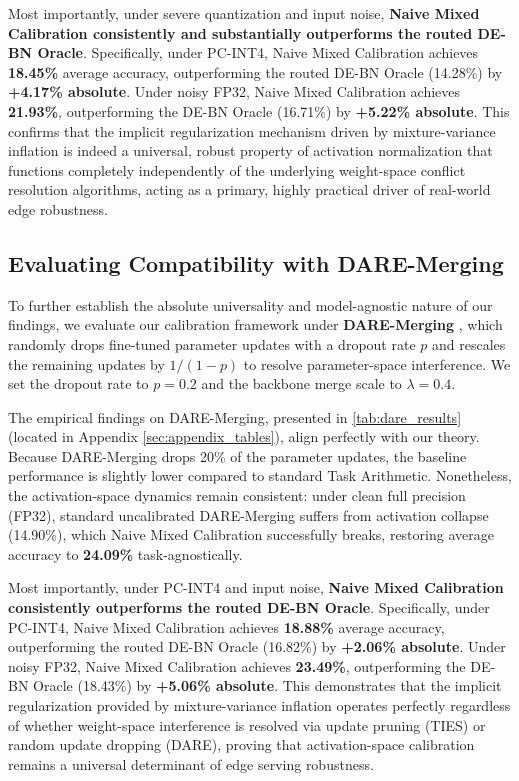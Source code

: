 \documentclass{article}
\theoremstyle{plain}
\theoremstyle{definition}
\theoremstyle{remark}
\begin{document}
Most importantly, under severe quantization and input noise, \textbf{Naive Mixed Calibration consistently and substantially outperforms the routed DE-BN Oracle}. Specifically, under PC-INT4, Naive Mixed Calibration achieves \textbf{18.45\%} average accuracy, outperforming the routed DE-BN Oracle (14.28\%) by \textbf{+4.17\% absolute}. Under noisy FP32, Naive Mixed Calibration achieves \textbf{21.93\%}, outperforming the DE-BN Oracle (16.71\%) by \textbf{+5.22\% absolute}. This confirms that the implicit regularization mechanism driven by mixture-variance inflation is indeed a universal, robust property of activation normalization that functions completely independently of the underlying weight-space conflict resolution algorithms, acting as a primary, highly practical driver of real-world edge robustness.

\vspace{-8pt}
\subsection{Evaluating Compatibility with DARE-Merging}
To further establish the absolute universality and model-agnostic nature of our findings, we evaluate our calibration framework under \textbf{DARE-Merging} \cite{Yu2024Dare, Jin2023Dare}, which randomly drops fine-tuned parameter updates with a dropout rate $p$ and rescales the remaining updates by $1/(1-p)$ to resolve parameter-space interference. We set the dropout rate to $p = 0.2$ and the backbone merge scale to $\lambda = 0.4$.

The empirical findings on DARE-Merging, presented in \cref{tab:dare_results} (located in Appendix \ref{sec:appendix_tables}), align perfectly with our theory. Because DARE-Merging drops 20\% of the parameter updates, the baseline performance is slightly lower compared to standard Task Arithmetic. Nonetheless, the activation-space dynamics remain consistent: under clean full precision (FP32), standard uncalibrated DARE-Merging suffers from activation collapse (14.90\%), which Naive Mixed Calibration successfully breaks, restoring average accuracy to \textbf{24.09\%} task-agnostically.

Most importantly, under PC-INT4 and input noise, \textbf{Naive Mixed Calibration consistently outperforms the routed DE-BN Oracle}. Specifically, under PC-INT4, Naive Mixed Calibration achieves \textbf{18.88\%} average accuracy, outperforming the routed DE-BN Oracle (16.82\%) by \textbf{+2.06\% absolute}. Under noisy FP32, Naive Mixed Calibration achieves \textbf{23.49\%}, outperforming the DE-BN Oracle (18.43\%) by \textbf{+5.06\% absolute}. This demonstrates that the implicit regularization provided by mixture-variance inflation operates perfectly regardless of whether weight-space interference is resolved via update pruning (TIES) or random update dropping (DARE), proving that activation-space calibration remains a universal determinant of edge serving robustness.
\end{document}
